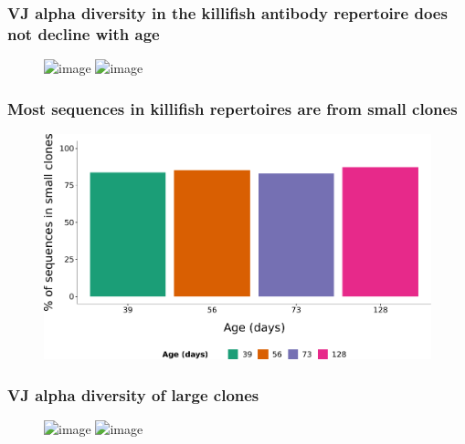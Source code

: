\documentclass[presentation]{beamer}
\newlength{\slideheight}
\begin{document}
\begin{frame}
\frametitle{\textbf{VJ} alpha diversity in the killifish antibody repertoire \textbf{does not decline} with age}
\begin{figure}
\includegraphics<1>[height=0.95\slideheight]{figs/pdf/ageing-vj-diversity-alpha}
\includegraphics<2>[height=0.95\slideheight]{figs/pdf/ageing-vj-diversity-alpha-sig}
\end{figure}
\end{frame}

\begin{frame}
\frametitle{Most sequences in killifish repertoires are from small clones}
\begin{figure}
\centering
\includegraphics[height=\slideheight]{figs/pdf/ageing-pc-seq-in-small-clones}
\end{figure}
\end{frame}

\begin{frame}
\frametitle{\textbf{VJ} alpha diversity of \textbf{large clones} }
\begin{figure}
\includegraphics<2>[height=0.95\slideheight]{figs/pdf/ageing-vj-diversity-vlarge-alpha}
\includegraphics<3>[height=0.95\slideheight]{figs/pdf/ageing-vj-diversity-vlarge-alpha-sig}
\end{figure}
\end{frame}

\blackslide
\end{document}
